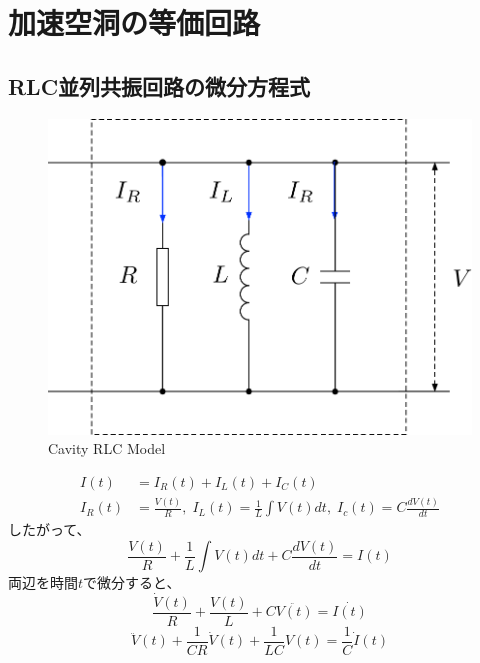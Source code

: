 \documentclass[book]{jlreq}
\begin{document}
\chapter{加速空洞の等価回路}
\section{RLC並列共振回路の微分方程式}
%
\begin{figure}[hbt]
    \begin{center}
        \includegraphics[width=12cm,clip]{figs/RLC_Model.pdf}
        \caption{Cavity RLC Model}
        \label{fig:RLC}
    \end{center}
\end{figure}
%
\begin{equation}
    \begin{split}
        I(t) &= I_R(t) + I_L(t) + I_C(t) \\
        I_R(t) &= \frac{V(t)}{R}, \; I_L(t) = \frac{1}{L}\int V(t) dt, \; I_c(t) = C\frac{dV(t)}{dt}
    \end{split}
\end{equation}
%
したがって、
%
\begin{equation}
    \frac{V(t)}{R} + \frac{1}{L}\int V(t) dt + C\frac{dV(t)}{dt} = I(t)
\end{equation}
%
両辺を時間$t$で微分すると、
%
\begin{equation}
    \frac{\dot{V}(t)}{R} + \frac{V(t)}{L}+ C \ddot{V(t)} = \dot{I(t)}
\end{equation}
%
\begin{equation}
    \ddot{V}(t) + \frac{1}{CR}\dot{V}(t) + \frac{1}{LC} V(t) = \frac{1}{C}\dot{I}(t)
\end{equation}
\end{document}
